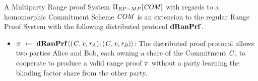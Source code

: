 \begin{definition}\label{def:pre:mp-rangeproof}
    A Multiparty Range proof System $\Pi_{RP-MP}[\mathit{COM}]$ with regards to a homomorphic Commitment Scheme $\mathit{COM}$ is an extension to the regular Range Proof System with the following
    distributed protocol $\mathbf{dRanPrf}$.
    \begin{itemize}
        \item $\pi ~\leftarrow~ \mathbf{dRanPrf} \langle(\mathit{C},\mathit{v},\mathit{r}_{\mathit{A}}),(\mathit{C},\mathit{v},\mathit{r}_{\mathit{B}})\rangle$: The distributed proof protocol allows two parties Alice and Bob, each owning a share of the
        Commitment $\mathit{C}$, to cooperate to produce a valid range proof $\pi$ without a party learning the blinding factor share from the other party.
    \end{itemize}
\end{definition}